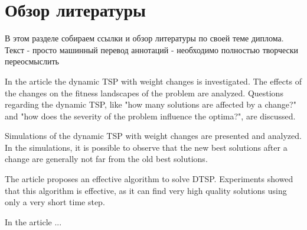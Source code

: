 

\chapter{Обзор  литературы }
 
{\color{red}  В этом разделе собираем ссылки и обзор литературы по своей теме диплома. Текст - просто машинный перевод аннотаций - необходимо полностью творчески переосмыслить }

{\color{blue}  
In the article  \cite{Tinos2015} the dynamic TSP with weight changes is investigated. The effects of the changes on the fitness landscapes of the problem are analyzed. Questions regarding the dynamic TSP, like "how many solutions are affected by a change?" and "how does the severity of the problem influence the optima?", are discussed. 

Simulations of the dynamic TSP with weight changes are presented and analyzed. In the simulations, it is possible to observe that the new best solutions after a change are generally not far from the old best solutions. 


The article \cite{10.1007/11903697_31}   proposes an effective algorithm to solve DTSP. Experiments showed that this algorithm is effective, as it can find very high quality solutions using only a very short time step.
}

In the article \cite{Gharehchopogh2012} ... 


